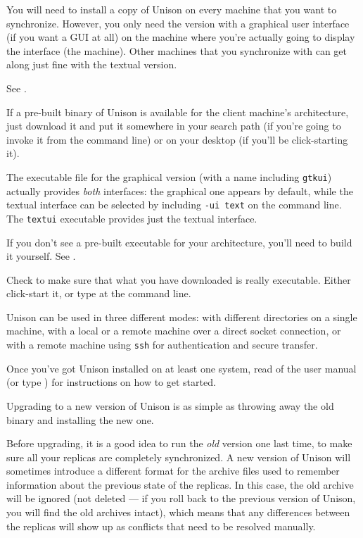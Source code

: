 \documentclass{article}
\begin{document}
You will need to install a copy of Unison on every machine that you
want to synchronize.  However, you only need the version with a
graphical user interface (if you want a GUI at all) on the machine
where you're actually going to display the interface (the \CLIENT{}
machine).  Other machines that you synchronize with can get along just
fine with the textual version.



See .

If a pre-built binary of Unison is available for the client machine's
architecture, just download it and put it somewhere in your search
path (if you're going to invoke it from the command line) or on your
desktop (if you'll be click-starting it).

The executable file for the graphical version (with a name including
\verb|gtkui|) actually provides {\em both} interfaces: the graphical one
appears by default, while the textual interface can be selected by including
\verb|-ui text| on the command line.  The \verb|textui| executable
provides just the textual interface.

If you don't see a pre-built executable for your architecture, you'll
need to build it yourself.  See .

Check to make sure that what you have downloaded is really executable.
Either click-start it, or type  at the command
line.

Unison can be used in three different modes: with different directories on a
single machine, with a local or a remote machine over a direct socket connection, or
with a remote machine using {\tt ssh} for authentication and secure
transfer.


Once you've got Unison installed on at least one system, read
 of the user manual (or type ) for instructions on how to get started.



Upgrading to a new version of Unison is as simple as throwing away the old
binary and installing the new one.

Before upgrading, it is a good idea to run the {\em old} version one last
time, to make sure all your replicas are completely synchronized.  A new
version of Unison will sometimes introduce a different format for the
archive files used to remember information about the previous state of the
replicas.  In this case, the old archive will be ignored (not deleted --- if
you roll back to the previous version of Unison, you will find the old
archives intact), which means that any differences between the replicas will
show up as conflicts that need to be resolved manually.
\end{document}

